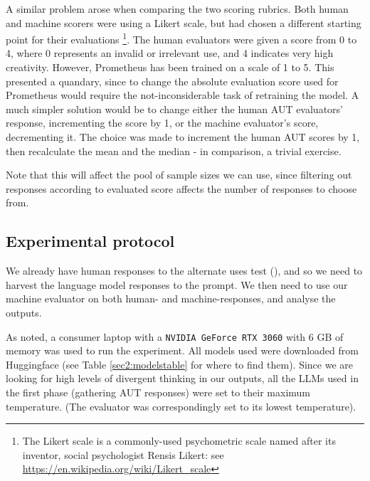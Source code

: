 \documentclass{article}
\begin{document}
A similar problem arose when comparing the two scoring rubrics. Both human and machine scorers were using a Likert scale, but had chosen a different starting point for their evaluations \footnote{The Likert scale is a commonly-used  psychometric scale named after its inventor, social psychologist Rensis Likert: see \url{https://en.wikipedia.org/wiki/Likert_scale}}. The human evaluators were given a score from 0 to 4, where 0 represents an invalid or irrelevant use, and 4 indicates very high creativity.  However, Prometheus has been trained on a scale of 1 to 5. This presented a quandary, since to change the absolute evaluation score used for Prometheus would require the not-inconsiderable task of retraining the model. A much simpler solution would be to change either the human AUT evaluators' response, incrementing the score by 1, or the machine evaluator's score, decrementing it. The choice was made to increment the human AUT scores by 1, then recalculate the mean and the median - in comparison, a trivial exercise. 

Note that this will affect the pool of sample sizes we can use, since filtering out responses according to evaluated score affects the number of responses to choose from. 


\subsection{Experimental protocol}
\label{sec:protocol}

We already have human responses to the alternate uses test (\cite{AUTdataset}), and so we need to harvest the language model responses to the prompt. We then need to use our machine evaluator on both human- and machine-responses, and analyse the outputs.  

As noted, a consumer laptop with a \texttt{NVIDIA GeForce RTX 3060} with 6 GB of memory was used to run the experiment. All models used were downloaded from Huggingface (see Table \ref{sec2:modelstable} for where to find them). Since we are looking for high levels of divergent thinking in our outputs, all the LLMs used in the first phase (gathering AUT responses) were set to their maximum temperature. (The evaluator was correspondingly set to its lowest temperature). 
\end{document}
